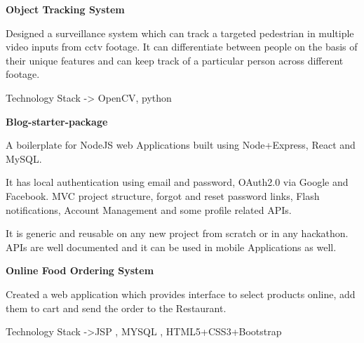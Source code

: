 \documentclass[a4paper]{article}
\begin{document}
\textbf{Object Tracking System
\href{https://github.com/orton009}{\faGithub}}
\vspace{-1mm}
\begin{itemize}
	\small{\item Designed a surveillance system which can track a targeted pedestrian in multiple video inputs from cctv footage. It can differentiate between people on the basis of their unique features and can keep track of a particular person across different footage.}
	\small{\item Technology Stack -> OpenCV, python }
	\vspace{-1mm}
\end{itemize}

\textbf{Blog-starter-package
\href{https://github.com/orton009}{\faGithub}}
\vspace{-1mm}
\begin{itemize}
	\small{\item A boilerplate for NodeJS web Applications built using Node+Express, React and MySQL.}
	\small{\item It has local authentication using email and password, OAuth2.0 via Google and Facebook. MVC project structure, forgot and reset password links, Flash notifications, Account Management and some profile related APIs. }
	\small{\item It is generic and reusable on any new project from scratch or in any hackathon. APIs are well documented and it can be used in mobile Applications as well.}
\end{itemize}

\textbf{Online Food Ordering System
\href{https://github.com/orton009}{\faGithub}}
\vspace{-1mm}
\begin{itemize}
	\small{\item Created a web application which provides interface to select products online, add them to cart and send the order to the Restaurant. }
	\small{\item Technology Stack ->JSP , MYSQL , HTML5+CSS3+Bootstrap}
	\vspace{-1mm}
\end{itemize}
\end{document}
